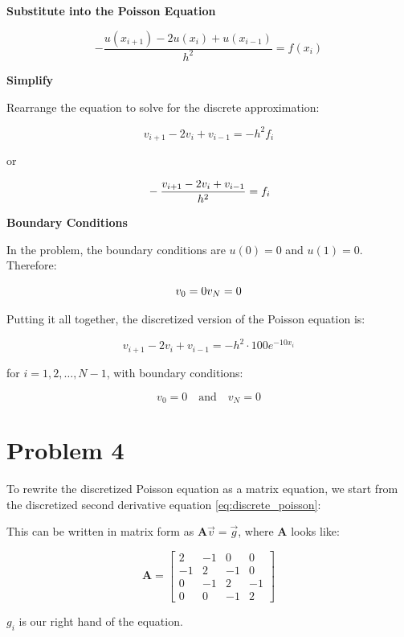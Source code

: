\documentclass[english,notitlepage]{revtex4-1}  %
\begin{document}
\textbf{Substitute into the Poisson Equation}

$$
    -\frac{u(x_{i+1}) - 2 u(x_i) + u(x_{i-1})}{h^2} = f(x_i)
$$

\textbf{Simplify}

Rearrange the equation to solve for the discrete approximation:

$$
    v_{i+1} - 2 v_i + v_{i-1} = -h^2 f_i
$$

or

\begin{equation}{\label{eq:discrete_poisson}}
    -\frac{v_{i+1} - 2 v_i + v_{i-1}}{h^2} = f_i
\end{equation}

\textbf{Boundary Conditions}

In the problem, the boundary conditions are $u(0) = 0$ and $u(1) = 0$. Therefore:

$$
    v_0 = 0 \\v_N = 0
$$

Putting it all together, the discretized version of the Poisson equation is:

$$
    v_{i+1} - 2 v_i + v_{i-1} = -h^2 \cdot 100 e^{-10 x_i}
$$

for $i = 1, 2, \ldots, N-1$, with boundary conditions:

$$
    v_0 = 0 \quad \text{and} \quad v_N = 0
$$

\section*{Problem 4}
To rewrite the discretized Poisson equation as a matrix equation,
we start from the discretized second derivative equation \ref{eq:discrete_poisson}:

This can be written in matrix form as $\mathbf{A} \vec{v} = \vec{g}$, where  $\mathbf{A}$ looks like:

$$
    \mathbf{A} = \begin{bmatrix}
        2  & -1 & 0  & 0  \\
        -1 & 2  & -1 & 0  \\
        0  & -1 & 2  & -1 \\
        0  & 0  & -1 & 2
    \end{bmatrix}
$$

$g_i$ is our right hand of the equation.
\end{document}
